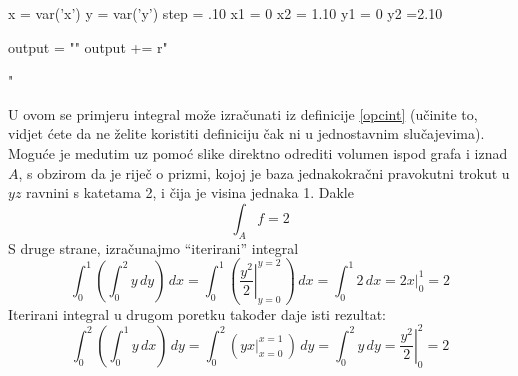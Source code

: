 \documentclass[a4paper, 11pt]{article}
\theoremstyle{plain}
\theoremstyle{plain}
\theoremstyle{definition}
\theoremstyle{remark}
\begin{document}
\begin{center}
\begin{sagesilent}
    x = var('x')
    y = var('y')
    step = .10
    x1 = 0
    x2 = 1.10
    y1 = 0
    y2 =2.10

    output = ""
    output += r""
\end{sagesilent}
\end{center}

\indent U ovom se primjeru integral može izračunati iz definicije \eqref{opcint} (učinite to, vidjet ćete da ne želite koristiti definiciju čak ni u jednostavnim slučajevima). Moguće je medutim uz pomoć slike
direktno odrediti volumen ispod grafa i iznad $A$, s obzirom da je riječ o prizmi, kojoj je baza
jednakokračni pravokutni trokut u $yz$ ravnini s katetama 2, i čija je visina jednaka 1. Dakle
    $$
    \int_A f= 2
    $$
S druge strane, izračunajmo “iterirani” integral
    \begin{equation*}
        \int_0^1 \left( \int_0^2y\, dy\right)\, dx= 
        \int_0^1 \left( \left.\frac{y^2}{2}\right\rvert^{y=2}_{y=0}\, \right)\, dx=
        \int_0^1 2\, dx= 
        \left.2x\right\rvert^{1}_{0}=
        2
    \end{equation*}
Iterirani integral u drugom poretku također daje isti rezultat:
    \begin{equation*}
        \int_0^2 \left( \int_0^1y\, dx\right)\, dy= 
        \int_0^2 \left( \left.yx\right\rvert^{x=1}_{x=0}\, \right)\, dy=
        \int_0^2 y\, dy= 
        \left.\frac{y^2}{2}\right\rvert^{2}_{0}=
        2
    \end{equation*}
\end{document}
